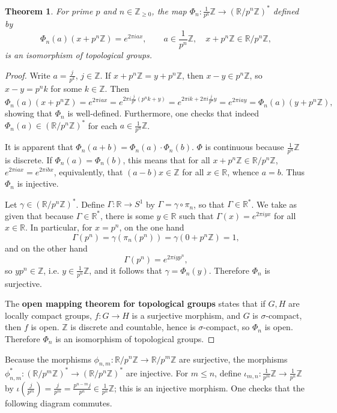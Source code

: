 \documentclass{article}
\newtheorem{theorem}{Theorem}
\theoremstyle{definition}
\begin{document}
\begin{theorem}
For prime $p$ and $n \in \mathbb{Z}_{\geq 0}$, the map
$\Phi_n:\frac{1}{p^n} \mathbb{Z} \to  (\mathbb{R}/p^n \mathbb{Z})^*$ defined by
\[
\Phi_n(a)(x+p^n \mathbb{Z}) = e^{2\pi i ax}, \qquad a \in \frac{1}{p^n}\mathbb{Z},\quad
x + p^n \mathbb{Z} \in \mathbb{R}/p^n \mathbb{Z},
\]
is an isomorphism of topological groups.
\end{theorem}
\begin{proof}
Write $a=\frac{j}{p^k}$, $j \in \mathbb{Z}$. 
If $x+p^n \mathbb{Z} = y+p^n \mathbb{Z}$, then $x-y \in  p^n \mathbb{Z}$, so $x-y=p^nk$ for some $k \in \mathbb{Z}$. Then
\[
\Phi_n(a)(x+p^n\mathbb{Z}) = e^{2\pi iax} = e^{2\pi i \frac{j}{p^n}(p^nk+y)} = e^{2\pi ik + 2\pi i \frac{j}{p^n}y}
=e^{2\pi i ay} = \Phi_n(a)(y+p^n\mathbb{Z}),
\]
showing that $\Phi_n$ is well-defined. Furthermore, one checks that indeed $\Phi_n(a) \in (\mathbb{R}/p^n \mathbb{Z})^*$ for each
$a \in \frac{1}{p^n} \mathbb{Z}$. 

It is apparent that $\Phi_n(a+b)=\Phi_n(a) \cdot \Phi_n(b)$. $\Phi$ is continuous because $\frac{1}{p^n} \mathbb{Z}$ is discrete. If 
$\Phi_n(a)=\Phi_n(b)$, this means that for all $x + p^n \mathbb{Z} \in \mathbb{R}/p^n \mathbb{Z}$, $e^{2\pi i ax}=e^{2\pi ibx}$,
equivalently, that $(a-b)x \in \mathbb{Z}$ for all $x \in \mathbb{R}$, whence $a=b$. Thus $\Phi_n$ is injective. 

Let $\gamma \in (\mathbb{R}/p^n \mathbb{Z})^*$. Define $\Gamma:\mathbb{R} \to S^1$ by $\Gamma = \gamma \circ \pi_n$,
so that $\Gamma \in \mathbb{R}^*$. We take as given that  because $\Gamma \in \mathbb{R}^*$, there is some
 $y \in \mathbb{R}$ such that 
$\Gamma(x)=e^{2\pi iyx}$ for all $x \in \mathbb{R}$. In particular, for $x=p^n$, on the one hand
\[
\Gamma(p^n)=\gamma(\pi_n(p^n)) = \gamma(0+p^n \mathbb{Z}) = 1,
\]
and on the other hand
\[
\Gamma(p^n) = e^{2\pi iy p^n},
\]
so $y p^n \in \mathbb{Z}$, i.e. $y \in \frac{1}{p^n} \mathbb{Z}$, and it follows that $\gamma = \Phi_n(y)$. Therefore $\Phi_n$ is surjective.


The \textbf{open mapping theorem for topological groups} states that if $G,H$ are locally compact groups, $f:G \to H$
is a surjective morphism, and $G$ is $\sigma$-compact, then $f$ is open. $\mathbb{Z}$ is discrete and countable, hence is $\sigma$-compact, so
$\Phi_n$ is open. Therefore $\Phi_n$ is an isomorphism of topological groups.
\end{proof}

Because the morphisms $\phi_{n,m}:\mathbb{R}/p^n \mathbb{Z} \to \mathbb{R}/p^m \mathbb{Z}$ are surjective,
the morphisms $\phi_{n,m}^*: (\mathbb{R}/p^m \mathbb{Z})^* \to  (\mathbb{R}/p^n \mathbb{Z})^*$ are injective. 
For $m \leq n$,
define $\iota_{m,n}: \frac{1}{p^m} \mathbb{Z} \to \frac{1}{p^n}\mathbb{Z}$ by
$\iota\left(\frac{j}{p^m}\right)=\frac{j}{p^m}=\frac{p^{n-m}j}{p^n} \in \frac{1}{p^n} \mathbb{Z}$; this is an injective morphism.
One checks that the following diagram commutes.
 
\end{document}

